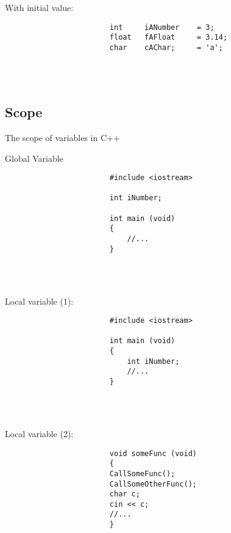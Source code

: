 \documentclass{report}
\begin{document}
				\begin{minipage}{\linewidth}
					With initial value:
					\begin{lstlisting}
						int		iANumber	= 3;
						float	fAFloat		= 3.14;
						char	cAChar;		= 'a';
					\end{lstlisting}
				\end{minipage}
				\\ \\
			
			
			\subsection{Scope}
				The scope of variables in C++ \\
				
				\begin{minipage}{\linewidth}
					Global Variable
					\begin{lstlisting}
						#include <iostream>
						
						int iNumber;
						
						int main (void)
						{
							//...
						}
					\end{lstlisting}
				\end{minipage}
				\\ \\
				
				\begin{minipage}{\linewidth}
					Local variable (1):
					\begin{lstlisting}
						#include <iostream>
						
						int main (void)
						{
							int iNumber;
							//...
						}
					\end{lstlisting}
				\end{minipage}
				\\ \\
				
				\begin{minipage}{\linewidth}
					Local variable (2):
					\begin{lstlisting}
						void someFunc (void)
						{
						CallSomeFunc();
						CallSomeOtherFunc();
						char c;
						cin << c;
						//...
						}
					\end{lstlisting}
				\end{minipage}
				\\ \\
				
\end{document}
